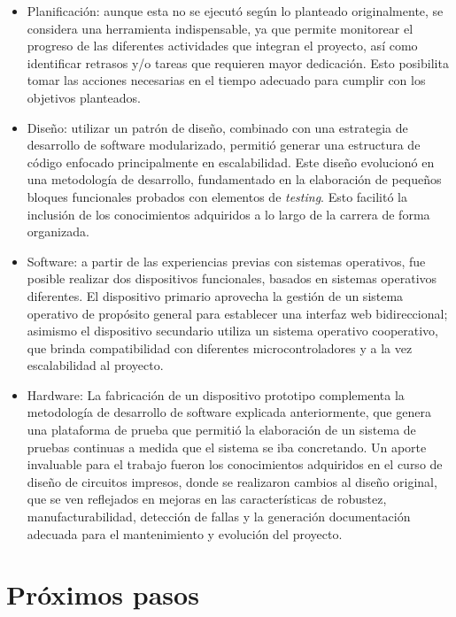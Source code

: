 \begin{itemize}
\item Planificación: aunque esta no se ejecutó según lo planteado originalmente, se considera una herramienta indispensable, ya que permite monitorear el progreso de las diferentes actividades que  integran el proyecto, así como identificar  retrasos  y/o  tareas que requieren mayor dedicación. Esto posibilita tomar las acciones necesarias en el tiempo adecuado para cumplir con los objetivos planteados.
\item Diseño: utilizar un patrón de diseño, combinado con una estrategia de desarrollo de software modularizado, permitió generar una estructura de código enfocado principalmente en escalabilidad. Este diseño evolucionó en una metodología de desarrollo, fundamentado en la elaboración de pequeños bloques funcionales probados con elementos de  \textit{testing}. Esto facilitó la inclusión de los conocimientos adquiridos a lo largo de la carrera de forma organizada.  
\item Software: a partir de las experiencias previas con sistemas operativos, fue posible realizar dos dispositivos funcionales, basados en sistemas operativos diferentes. El dispositivo primario aprovecha la gestión de un sistema operativo de propósito general para establecer una interfaz web bidireccional; asimismo el dispositivo secundario utiliza un sistema operativo cooperativo, que brinda compatibilidad con diferentes microcontroladores y a la vez escalabilidad al proyecto.   
\item Hardware: La fabricación de un dispositivo prototipo complementa la metodología de desarrollo de software explicada anteriormente, que genera una plataforma de prueba que permitió la elaboración de un sistema de pruebas continuas a medida que el sistema se iba concretando. Un aporte invaluable para el trabajo fueron los conocimientos adquiridos en el curso de diseño de circuitos impresos, donde se realizaron cambios al diseño original, que se ven reflejados en mejoras en las características de robustez, manufacturabilidad, detección de fallas y la generación documentación adecuada para el mantenimiento y evolución del proyecto. 
\end{itemize}


\section{Próximos pasos}

